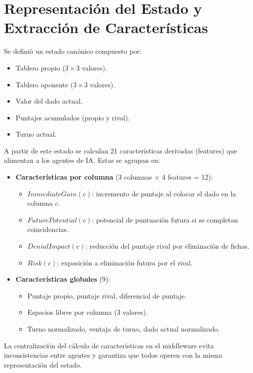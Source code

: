 \section{Representación del Estado y Extracción de Características}

Se definió un estado canónico compuesto por:

\begin{itemize}
    \item Tablero propio ($3 \times 3$ valores).
    \item Tablero oponente ($3 \times 3$ valores).
    \item Valor del dado actual.
    \item Puntajes acumulados (propio y rival).
    \item Turno actual.
\end{itemize}

A partir de este estado se calculan 21 características derivadas (features) que alimentan a los agentes de IA. Estas se agrupan en:

\begin{itemize}
    \item \textbf{Características por columna} (3 columnas $\times$ 4 features = 12):
    \begin{itemize}
        \item $ImmediateGain(c)$: incremento de puntaje al colocar el dado en la columna $c$.
        \item $FuturePotential(c)$: potencial de puntuación futura si se completan coincidencias.
        \item $DenialImpact(c)$: reducción del puntaje rival por eliminación de fichas.
        \item $Risk(c)$: exposición a eliminación futura por el rival.
    \end{itemize}
    \item \textbf{Características globales} (9):
    \begin{itemize}
        \item Puntaje propio, puntaje rival, diferencial de puntaje.
        \item Espacios libres por columna (3 valores).
        \item Turno normalizado, ventaja de turno, dado actual normalizado.
    \end{itemize}
\end{itemize}

La centralización del cálculo de características en el middleware evita inconsistencias entre agentes y garantiza que todos operen con la misma representación del estado.

